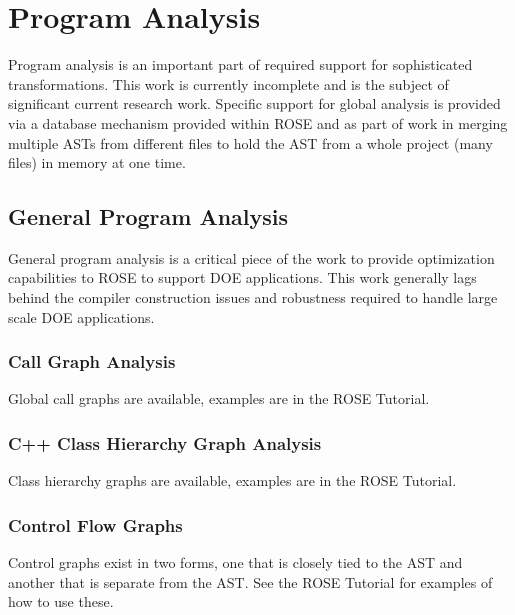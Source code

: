 \chapter{Program Analysis}

\label{ProgramAnalysis}


Program analysis is an important part of required support for sophisticated 
transformations. This work is currently incomplete and is
the subject of significant current research work.  Specific support for global analysis 
is provided via a database mechanism provided within ROSE and as part of work
in merging multiple ASTs from different files to hold the AST from a whole project
(many files) in memory at one time.

\section{General Program Analysis}

   General program analysis is a critical piece of the work to
provide optimization capabilities to ROSE to support DOE applications.
This work generally lags behind the compiler construction issues
and robustness required to handle large scale DOE applications.

\subsection{Call Graph Analysis}

   Global call graphs are available, examples are in the
ROSE Tutorial.

\subsection{C++ Class Hierarchy Graph Analysis}

   Class hierarchy graphs are available, examples are in the
ROSE Tutorial.

\subsection{Control Flow Graphs}

   Control graphs exist in two forms, one that is closely tied to
the AST and another that is separate from the AST.  See the ROSE
Tutorial for examples of how to use these.

